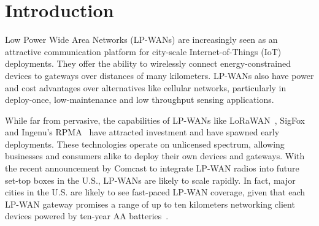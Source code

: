 
\section{Introduction}
\label{sec:intro}

Low Power Wide Area Networks (LP-WANs) are increasingly seen as an attractive
communication platform for city-scale Internet-of-Things (IoT) deployments.
They offer the ability to wirelessly connect energy-constrained devices to
gateways over distances of many kilometers. LP-WANs also have power and cost
advantages over alternatives like cellular networks, particularly in
deploy-once, low-maintenance and low throughput sensing applications.

While far from pervasive, the capabilities of LP-WANs like
LoRaWAN~\cite{Sornin2015, LoRaWanAlliance2015}, SigFox~\cite{centenaro2016}
and Ingenu's RPMA~\cite{Ingenu2015} have attracted investment and have spawned
early deployments. These technologies operate on unlicensed spectrum, allowing
businesses and consumers alike to deploy their own devices and gateways. With the
recent announcement by Comcast \cite{comcast, comcast2} to integrate LP-WAN
radios into future set-top boxes in the U.S., LP-WANs are likely to scale
rapidly. In fact, major cities in the U.S. are likely to see fast-paced LP-WAN
coverage, given that each LP-WAN gateway promises a range of up to ten
kilometers networking client devices powered by ten-year AA batteries~\cite{LoRaWanAlliance2015}.

